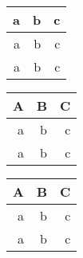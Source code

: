 \documentclass{article}
\begin{document}
\begin{tabular}{|r|r|r|}
\hline
a&b&c\\ \hline
a&b&c\\ \hline
a&b&c\\ \hline
\end{tabular}
\begin{tabular}{|rr|r|}
\hline
A&B&C\\ \hline \hline
a&b&c\\ \hline
a&b&c\\ \hline
\end{tabular}
\begin{longtable}{|r|r|r|}
\hline
A&B&C\\ \hline \hline
a&b&c\\ \hline
a&b&c\\ \hline
\end{longtable}
\end{document}
